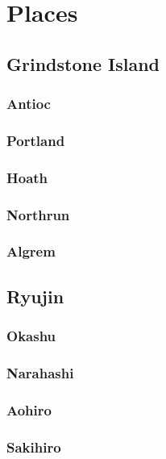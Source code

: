 \section{Places}

	\subsection{Grindstone Island}

		\subsubsection{Antioc}

		\subsubsection{Portland}

		\subsubsection{Hoath}
	
		\subsubsection{Northrun}
	
		\subsubsection{Algrem}

	\subsection{Ryujin}

		\subsubsection{Okashu}

		\subsubsection{Narahashi}

		\subsubsection{Aohiro}
	
		\subsubsection{Sakihiro}
	
